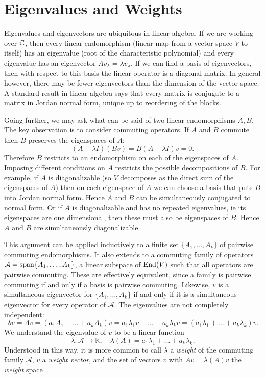 \section{Eigenvalues and Weights}

Eigenvalues and eigenvectors are ubiquitous in linear algebra.
If we are working over $\mathbb{C}$, then every linear endomorphism (linear map from a vector space $V$ to itself) has an eigenvalue (root of the characteristic polynomial) and every eigenvalue has an eigenvector $Av_\lambda = \lambda v_\lambda$.
If we can find a basis of eigenvectors, then with respect to this basis the linear operator is a diagonal matrix.
In general however, there may be fewer eigenvectors than the dimension of the vector space.
A standard result in linear algebra says that every matrix is conjugate to a matrix in Jordan normal form, unique up to reordering of the blocks.

Going further, we may ask what can be said of two linear endomorphisms $A,B$.
The key observation is to consider commuting operators.
If $A$ and $B$ commute then $B$ preserves the eigenspaces of $A$:
\[
(A- \lambda I) (Bv) 
= B(A- \lambda I) v
= 0.
\]
Therefore $B$ restricts to an endomorphism on each of the eigenspaces of $A$.
Imposing different conditions on $A$ restricts the possible decompositions of $B$.
For example, if $A$ is diagonalizable (so $V$ decomposes as the direct sum of the eigenspaces of $A$) then on each eigenspace of $A$ we can choose a basis that puts $B$ into Jordan normal form.
Hence $A$ and $B$ can be simultaneously conjugated to normal form.
Or if $A$ is diagonalizable and has no repeated eigenvalues, ie its eigenspaces are one dimensional, then these must also be eigenspaces of $B$.
Hence $A$ and $B$ are simultaneously diagonalizable.

This argument can be applied inductively to a finite set $\{A_1,\dots,A_k\}$ of pairwise commuting endomorphisms.
It also extends to a commuting family of operators $\mathcal{A} = \operatorname{span}\{A_1,\dots,A_k\}$, a linear subspace of $\operatorname{End}(V)$ such that all operators are pairwise commuting.
These are effectively equivalent, since a family is pairwise commuting if and only if a basis is pairwise commuting.
Likewise, $v$ is a simultaneous eigenvector for $\{A_1,\dots,A_k\}$ if and only if it is a simultaneous eigenvector for every operator of $\mathcal{A}$.
The eigenvalues are not completely independent:
\[
\lambda v
= Av 
= (a_1A_1 + \dots + a_kA_k)v
= a_1 \lambda_1 v + \dots + a_k \lambda_k v
= (a_1 \lambda_1 + \dots + a_k \lambda_k )v.
\]
We understand the eigenvalue of $v$ to be a linear function 
\[
\lambda : \mathcal{A} \to \mathbb{K}, 
\quad
\lambda(A) = a_1 \lambda_1 + \dots + a_k \lambda_k .
\]
Understood in this way, it is more common to call $\lambda$ a \emph{weight} of the commuting family $\mathcal{A}$, $v$ a \emph{weight vector}, and the set of vectors $v$ with $Av = \lambda(A)v$ the \emph{weight} space~\cite[Definition~A.14]{Hall2015}.

